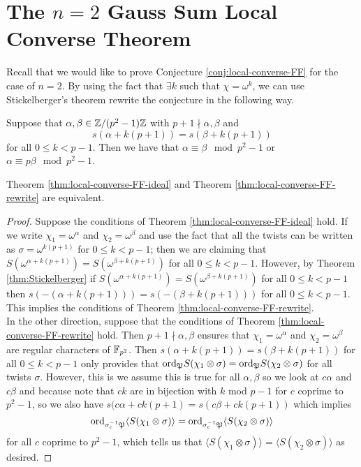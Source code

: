 \section{The $n=2$ Gauss Sum Local Converse Theorem}
\label{sec:n=2-LCT-FF}

Recall that we would like to prove Conjecture \ref{conj:local-converse-FF} for the case of $n=2$.
By using the fact that $\exists k$ such that $\chi = \omega^k$, we can use Stickelberger's theorem rewrite the conjecture in the following way.

\begin{theorem}\label{thm:local-converse-FF-rewrite}
Suppose that $\alpha, \beta \in \mathbb{Z}/(p^2 -1)\mathbb{Z}$ with $p+1 \nmid \alpha, \beta$ and \[s(\alpha + k(p+1)) = s(\beta + k(p+1))\] for all $0 \leq k < p-1$. Then we have that $\alpha \equiv \beta \mod p^2 - 1$ or $\alpha \equiv p \beta \mod p^2 -1$.
\end{theorem}

\begin{prop}
Theorem \ref{thm:local-converse-FF-ideal} and Theorem \ref{thm:local-converse-FF-rewrite} are equivalent.
\end{prop}

\begin{proof}
Suppose the conditions of Theorem \ref{thm:local-converse-FF-ideal} hold. 
If we write $\chi_1 = \omega^\alpha$ and $\chi_2 = \omega^\beta$ and use the fact that all the twists can be written as $\sigma = \omega^{k (p+1)}$ for $0 \leq k < p-1$; then we are claiming that $S(\omega^{\alpha + k(p+1)}) = S(\omega^{\beta+k(p+1)})$ for all $0 \leq k < p-1$. 
However, by Theorem \ref{thm:Stickelberger} if $S(\omega^{\alpha + k(p+1)}) = S(\omega^{\beta+k(p+1)})$ for all $0 \leq k < p-1$ then $s(-(\alpha + k(p+1))) = s(-(\beta+k(p+1)))$ for all $0 \leq k < p-1$. 
This implies the conditions of Theorem \ref{thm:local-converse-FF-rewrite}.
\\

In the other direction, suppose that the conditions of Theorem \ref{thm:local-converse-FF-rewrite} hold. 
Then $p+1 \nmid \alpha, \beta$ ensures that $\chi_1 = \omega^\alpha$ and $\chi_2 = \omega^\beta$ are regular characters of $\mathbb{F}_{p^2}$.
Then $s(\alpha + k(p+1)) = s(\beta + k(p+1))$ for all $0 \leq k < p-1$ only provides that $\textrm{ord}_{\mathfrak{P}} S(\chi_1 \otimes \sigma) = \textrm{ord}_{\mathfrak{P}} S(\chi_2 \otimes \sigma)$ for all twists $\sigma$.
However, this is we assume this is true for all $\alpha, \beta$ so we look at $c \alpha$ and $c \beta$ and because note that $ck$ are in bijection with $k$ mod $p-1$ for $c$ coprime to $p^2-1$, so we also have $s(c\alpha + ck(p+1) = s(c\beta + ck(p+1))$ which implies \[\textrm{ord}_{\sigma_{c}^{-1} \mathfrak{P}} \langle S(\chi_1 \otimes \sigma) \rangle = \textrm{ord}_{\sigma_{c}^{-1} \mathfrak{P}} \langle S(\chi_2 \otimes \sigma) \rangle\] for all $c$ coprime to $p^2 -1$, which tells us that $\langle S(\chi_1\otimes \sigma) \rangle = \langle S(\chi_2 \otimes \sigma) \rangle$ as desired.

\end{proof}

